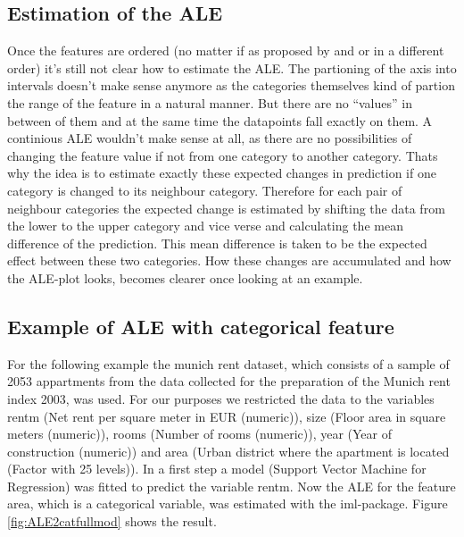 \documentclass[
]{krantz}
\begin{document}
\hypertarget{estimation-of-the-ale}{%
\subsection{Estimation of the ALE}\label{estimation-of-the-ale}}

Once the features are ordered (no matter if as proposed by \citep{Apley2016} and \citep{molnar2019} or in a different order) it's still not clear how to estimate the ALE. The partioning of the axis into intervals doesn't make sense anymore as the categories themselves kind of partion the range of the feature in a natural manner. But there are no ``values'' in between of them and at the same time the datapoints fall exactly on them. A continious ALE wouldn't make sense at all, as there are no possibilities of changing the feature value if not from one category to another category. Thats why the idea is to estimate exactly these expected changes in prediction if one category is changed to its neighbour category. Therefore for each pair of neighbour categories the expected change is estimated by shifting the data from the lower to the upper category and vice verse and calculating the mean difference of the prediction. This mean difference is taken to be the expected effect between these two categories. How these changes are accumulated and how the ALE-plot looks, becomes clearer once looking at an example.

\hypertarget{example-of-ale-with-categorical-feature}{%
\subsection{Example of ALE with categorical feature}\label{example-of-ale-with-categorical-feature}}

For the following example the munich rent dataset, which consists of a sample of 2053 appartments from the data collected for the preparation of the Munich rent index 2003, was used. For our purposes we restricted the data to the variables rentm (Net rent per square meter in EUR (numeric)), size (Floor area in square meters (numeric)), rooms (Number of rooms (numeric)), year (Year of construction (numeric)) and area (Urban district where the apartment is located (Factor with 25 levels)). In a first step a model (Support Vector Machine for Regression) was fitted to predict the variable rentm. Now the ALE for the feature area, which is a categorical variable, was estimated with the iml-package. Figure \ref{fig:ALE2catfullmod} shows the result.
\end{document}
